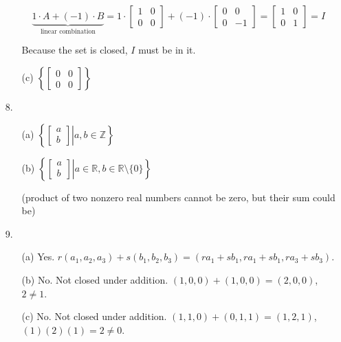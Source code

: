 \documentclass{article}
\begin{document}
\begin{enumerate}
\begin{itemize}
				\[\underbrace{1\cdot A+(-1)\cdot B}_{\text{linear combination}}=1\cdot\begin{bmatrix}
					1 & 0 \\
					0 & 0
				\end{bmatrix}+(-1)\cdot\begin{bmatrix}
					0 & 0 \\
					0 & -1
				\end{bmatrix}=\begin{bmatrix}
					1 & 0 \\ 
					0 & 1
				\end{bmatrix}=I\]

				Because the set is closed, $I$ must be in it.

			\item[(c)]
				$\left\{\begin{bmatrix}
					0 & 0 \\ 
					0 & 0
				\end{bmatrix}\right\}$
		\end{itemize}

	\item[8.]
		\begin{itemize}
			\item[(a)]
				$\left\{\left.\begin{bmatrix}
							a \\ b
				\end{bmatrix}\right|a,b\in\mathbb Z\right\}$

			\item[(b)]
				$\left\{\left.\begin{bmatrix}
							a \\ b
				\end{bmatrix}\right|a\in\mathbb R,b\in\mathbb R\setminus\{0\}\right\}$

				(product of two nonzero real numbers cannot be zero, but their sum could be)
		\end{itemize}

	\item[9.]
		\begin{itemize}
			\item[(a)] Yes.	$r(a_1,a_2,a_3)+s(b_1,b_2,b_3)=(ra_1+sb_1,ra_1+sb_1,ra_3+sb_3)$.

			\item[(b)] No. Not closed under addition. $(1,0,0)+(1,0,0)=(2,0,0)$, $2\neq1$.

			\item[(c)] No. Not closed under addition. $(1,1,0)+(0,1,1)=(1,2,1)$, $(1)(2)(1)=2\neq0$.


\end{itemize}
\end{enumerate}
\end{document}
